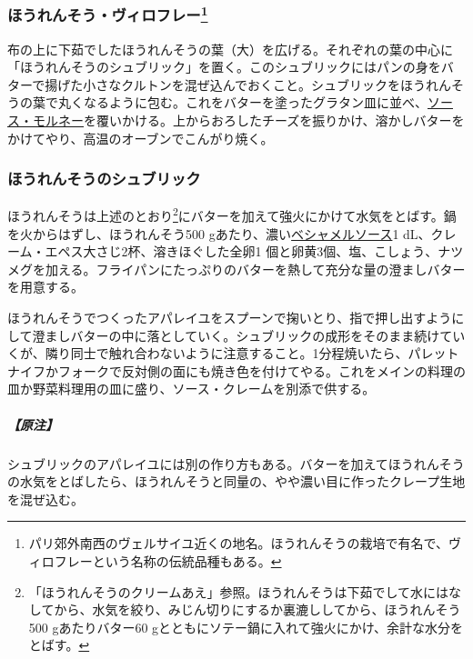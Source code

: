 \begin{recette}
\hypertarget{epinards-a-la-viroflay}{%
\subsubsection[ほうれんそう・ヴィロフレー]{\texorpdfstring{ほうれんそう・ヴィロフレー\footnote{パリ郊外南西のヴェルサイユ近くの地名。ほうれんそうの栽培で有名で、ヴィロフレーという名称の伝統品種もある。}}{ほうれんそう・ヴィロフレー}}\label{epinards-a-la-viroflay}}


布の上に下茹でしたほうれんそうの葉（大）を広げる。それぞれの葉の中心に「ほうれんそうのシュブリック」を置く。このシュブリックにはパンの身をバターで揚げた小さなクルトンを混ぜ込んでおくこと。シュブリックをほうれんそうの葉で丸くなるように包む。これをバターを塗ったグラタン皿に並べ、\protect\hyperlink{sauce-mornay}{ソース・モルネー}を覆いかける。上からおろしたチーズを振りかけ、溶かしバターをかけてやり、高温のオーブンでこんがり焼く。

\hypertarget{subric-d-epinards}{%
\subsubsection{ほうれんそうのシュブリック}\label{subric-d-epinards}}


ほうれんそうは上述のとおり\footnote{「ほうれんそうのクリームあえ」参照。ほうれんそうは下茹でして水にはなしてから、水気を絞り、みじん切りにするか裏漉ししてから、ほうれんそう500
  gあたりバター60
  gとともにソテー鍋に入れて強火にかけ、余計な水分をとばす。}にバターを加えて強火にかけて水気をとばす。鍋を火からはずし、ほうれんそう500
gあたり、濃い\protect\hyperlink{sauce-bechamel}{ベシャメルソース}1
dL、クレーム・エペス大さじ2杯、溶きほぐした全卵1
個と卵黄3個、塩、こしょう、ナツメグを加える。フライパンにたっぷりのバターを熱して充分な量の澄ましバターを用意する。

ほうれんそうでつくったアパレイユをスプーンで掬いとり、指で押し出すようにして澄ましバターの中に落としていく。シュブリックの成形をそのまま続けていくが、隣り同士で触れ合わないように注意すること。1分程焼いたら、パレットナイフかフォークで反対側の面にも焼き色を付けてやる。これをメインの料理の皿か野菜料理用の皿に盛り、ソース・クレームを別添で供する。

\hypertarget{nota-subric-d-epinards}{%
\subparagraph{【原注】}\label{nota-subric-d-epinards}}

シュブリックのアパレイユには別の作り方もある。バターを加えてほうれんそうの水気をとばしたら、ほうれんそうと同量の、やや濃い目に作ったクレープ生地を混ぜ込む。
\end{recette}
